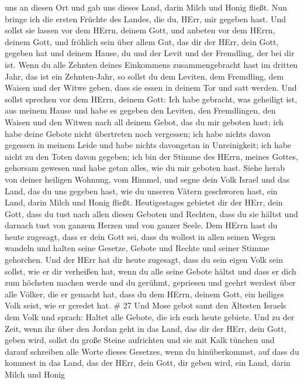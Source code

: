 uns an diesen Ort und gab uns dieses Land, darin Milch und Honig fließt.
 Nun bringe ich die ersten Früchte des Landes, die du,
HErr, mir gegeben hast. Und sollst sie lassen vor dem HErrn, deinem
Gott, und anbeten vor dem HErrn, deinem Gott,  und fröhlich
sein über allem Gut, das dir der HErr, dein Gott, gegeben hat und deinem
Hause, du und der Levit und der Fremdling, der bei dir ist.
 Wenn du alle Zehnten deines Einkommens zusammengebracht
hast im dritten Jahr, das ist ein Zehnten-Jahr, so sollst du dem
Leviten, dem Fremdling, dem Waisen und der Witwe geben, dass sie essen
in deinem Tor und satt werden.  Und sollst sprechen vor dem
HErrn, deinem Gott: Ich habe gebracht, was geheiligt ist, aus meinem
Hause und habe es gegeben den Leviten, den Fremdlingen, den Waisen und
den Witwen nach all deinem Gebot, das du mir geboten hast; ich habe
deine Gebote nicht übertreten noch vergessen;  ich habe
nichts davon gegessen in meinem Leide und habe nichts davongetan in
Unreinigkeit; ich habe nicht zu den Toten davon gegeben; ich bin der
Stimme des HErrn, meines Gottes, gehorsam gewesen und habe getan alles,
wie du mir geboten hast.  Siehe herab von deiner heiligen
Wohnung, vom Himmel, und segne dein Volk Israel und das Land, das du uns
gegeben hast, wie du unseren Vätern geschworen hast, ein Land, darin
Milch und Honig fließt.  Heutigestages gebietet dir der
HErr, dein Gott, dass du tust nach allen diesen Geboten und Rechten,
dass du sie hältst und darnach tust von ganzem Herzen und von ganzer
Seele.  Dem HErrn hast du heute zugesagt, dass er dein Gott
sei, dass du wollest in allen seinen Wegen wandeln und halten seine
Gesetze, Gebote und Rechte und seiner Stimme gehorchen. 
Und der HErr hat dir heute zugesagt, dass du sein eigen Volk sein
sollst, wie er dir verheißen hat, wenn du alle seine Gebote hältst
 und dass er dich zum höchsten machen werde und du gerühmt,
gepriesen und geehrt werdest über alle Völker, die er gemacht hat, dass
du dem HErrn, deinem Gott, ein heiliges Volk seist, wie er geredet hat.
\# 27  Und Mose gebot samt den Ältesten Israels dem Volk und
sprach: Haltet alle Gebote, die ich euch heute gebiete.  Und
zu der Zeit, wenn ihr über den Jordan geht in das Land, das dir der
HErr, dein Gott, geben wird, sollst du große Steine aufrichten und sie
mit Kalk tünchen  und darauf schreiben alle Worte dieses
Gesetzes, wenn du hinüberkommst, auf dass du kommest in das Land, das
der HErr, dein Gott, dir geben wird, ein Land, darin Milch und Honig
